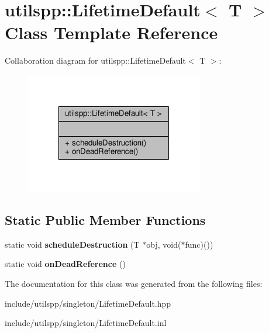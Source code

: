 \hypertarget{classutilspp_1_1LifetimeDefault}{\section{utilspp\-:\-:Lifetime\-Default$<$ T $>$ Class Template Reference}
\label{classutilspp_1_1LifetimeDefault}
}


Collaboration diagram for utilspp\-:\-:Lifetime\-Default$<$ T $>$\-:
\nopagebreak
\begin{figure}[H]
\begin{center}
\leavevmode
\includegraphics[width=220pt]{classutilspp_1_1LifetimeDefault__coll__graph}
\end{center}
\end{figure}
\subsection*{Static Public Member Functions}
\begin{DoxyCompactItemize}
\item 
\hypertarget{classutilspp_1_1LifetimeDefault_acdbf1092ebac30c09a8c87207a95eb5e}{static void {\bfseries schedule\-Destruction} (T $\ast$obj, void($\ast$func)())}\label{classutilspp_1_1LifetimeDefault_acdbf1092ebac30c09a8c87207a95eb5e}

\item 
\hypertarget{classutilspp_1_1LifetimeDefault_a8cc3c6a3bb643a0e39416ba3ab97fafb}{static void {\bfseries on\-Dead\-Reference} ()}\label{classutilspp_1_1LifetimeDefault_a8cc3c6a3bb643a0e39416ba3ab97fafb}

\end{DoxyCompactItemize}


The documentation for this class was generated from the following files\-:\begin{DoxyCompactItemize}
\item 
include/utilspp/singleton/Lifetime\-Default.\-hpp\item 
include/utilspp/singleton/Lifetime\-Default.\-inl\end{DoxyCompactItemize}
